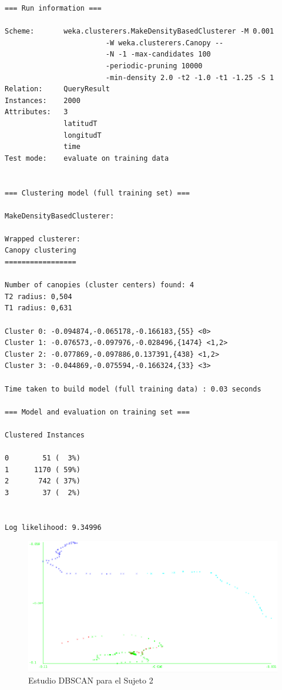 \documentclass[a4paper, 12pt]{article}
\begin{document}
\begin{verbatim}
=== Run information ===

Scheme:       weka.clusterers.MakeDensityBasedClusterer -M 0.001 
						-W weka.clusterers.Canopy -- 
						-N -1 -max-candidates 100 
						-periodic-pruning 10000 
						-min-density 2.0 -t2 -1.0 -t1 -1.25 -S 1
Relation:     QueryResult
Instances:    2000
Attributes:   3
              latitudT
              longitudT
              time
Test mode:    evaluate on training data


=== Clustering model (full training set) ===

MakeDensityBasedClusterer: 

Wrapped clusterer: 
Canopy clustering
=================

Number of canopies (cluster centers) found: 4
T2 radius: 0,504     
T1 radius: 0,631     

Cluster 0: -0.094874,-0.065178,-0.166183,{55} <0>
Cluster 1: -0.076573,-0.097976,-0.028496,{1474} <1,2>
Cluster 2: -0.077869,-0.097886,0.137391,{438} <1,2>
Cluster 3: -0.044869,-0.075594,-0.166324,{33} <3>

Time taken to build model (full training data) : 0.03 seconds

=== Model and evaluation on training set ===

Clustered Instances

0        51 (  3%)
1      1170 ( 59%)
2       742 ( 37%)
3        37 (  2%)


Log likelihood: 9.34996
\end{verbatim}

\begin{figure}[H]
	\includegraphics[scale=.5]{../comparativa/djClusterPruebaCanopySin.png}
	\caption{Estudio DBSCAN para el Sujeto 2}
\end{figure}
\end{document}
